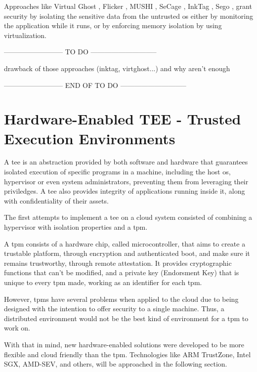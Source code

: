 Approaches like Virtual Ghost \cite{virtGhostPaper}, Flicker \cite{flickerPaper}, MUSHI \cite{mushiPaper}, SeCage \cite{SeCagePaper}, InkTag \cite{inkTagPaper}, Sego \cite{segoPaper}, grant security by isolating the sensitive data from the untrusted \gls{os} either by monitoring the application while it runs, or by enforcing memory isolation by using virtualization.


-------------------------- TO DO -----------------------------

			drawback of those approaches (inktag, virtghost...)
			and why aren't enough
			
-------------------------- END OF TO DO -----------------------------



\section{Hardware-Enabled TEE - Trusted Execution Environments}

A \gls{tee} is an abstraction provided by both software and hardware that guarantees isolated execution of specific programs in a machine, including the host \gls{os}, hypervisor or even system administrators, preventing them from leveraging their priviledges. A \gls{tee} also provides integrity of applications running inside it, along with confidentiality of their assets.

The first attempts to implement a \gls{tee} on a cloud system consisted of combining a hypervisor with isolation properties and a \gls{tpm}. 

A \gls{tpm} \cite{tpmPaper} consists of a hardware chip, called microcontroller, that aims to create a trustable platform, through encryption and authenticated boot, and make sure it remains trustworthy, through remote attestation. 
It provides cryptographic functions that can't be modified, and a private key (Endorsment Key) that is unique to every \gls{tpm} made, working as an identifier for each \gls{tpm}.

However, \gls{tpm}s have several problems when applied to the cloud due to being designed with the intention to offer security to a single machine. Thus, a distributed environment would not be the best kind of environment for a \gls{tpm} to work on.

With that in mind, new hardware-enabled solutions were developed to be more flexible and cloud friendly than the \gls{tpm}. Technologies like ARM TrustZone, Intel SGX, AMD-SEV, and others, will be approached in the following section.

